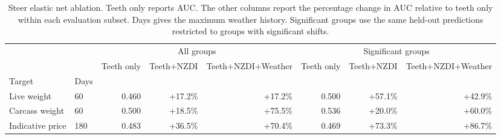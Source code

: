 \begin{table}
\caption{Steer elastic net ablation. Teeth only reports AUC. The other columns report the percentage change in AUC relative to teeth only within each evaluation subset. Days gives the maximum weather history. Significant groups use the same held-out predictions restricted to groups with significant shifts.}
\label{tab:steer_elasticnet_ablation}
\begin{tabular}{llrrrrrr}
\toprule
 &  & \multicolumn{3}{c}{All groups} & \multicolumn{3}{c}{Significant groups} \\
 &  & Teeth only & Teeth+NZDI & Teeth+NZDI+Weather & Teeth only & Teeth+NZDI & Teeth+NZDI+Weather \\
Target & Days &  &  &  &  &  &  \\
\midrule
Live weight & 60 & 0.460 & +17.2\% & +17.2\% & 0.500 & +57.1\% & +42.9\% \\
Carcass weight & 60 & 0.500 & +18.5\% & +75.5\% & 0.536 & +20.0\% & +60.0\% \\
Indicative price & 180 & 0.483 & +36.5\% & +70.4\% & 0.469 & +73.3\% & +86.7\% \\
\bottomrule
\end{tabular}
\end{table}
